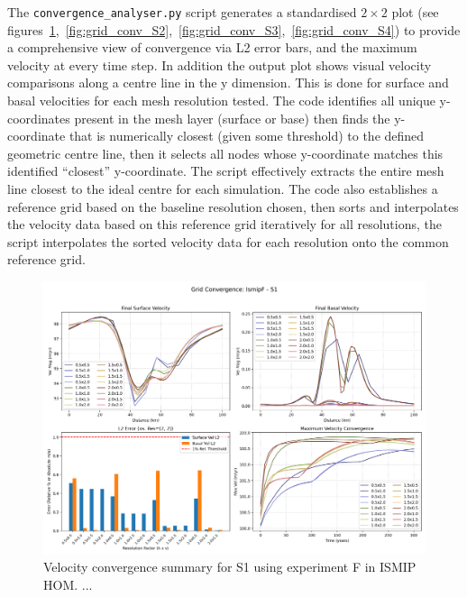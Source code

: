 The \texttt{convergence\_analyser.py} script generates a standardised $2\times2$ plot (see figures~\ref{fig:grid_conv_S1},~\ref{fig:grid_conv_S2},~\ref{fig:grid_conv_S3},~\ref{fig:grid_conv_S4}) to provide a comprehensive view of convergence via L2 error bars, and the maximum velocity at every time step. In addition the output plot shows visual velocity comparisons along a centre line in the y dimension. This is done for surface and basal velocities for each mesh resolution tested. The code identifies all unique y-coordinates present in the mesh layer (surface or base) then finds the y-coordinate that is numerically closest (given some threshold) to the defined geometric centre line, then it selects all nodes whose y-coordinate matches this identified ``closest'' y-coordinate. The script effectively extracts the entire mesh line closest to the ideal centre for each simulation. The code also establishes a reference grid based on the baseline resolution chosen, then sorts and interpolates the velocity data based on this reference grid iteratively for all resolutions, the script interpolates the sorted velocity data for each resolution onto the common reference grid. 

\begin{figure}[H]
    \includegraphics[scale=0.49]{IsmipF_S1_convergence_summary.png}
    \caption{Velocity convergence summary for S1 using experiment F in ISMIP HOM. ...}
    \label{fig:grid_conv_S1}
\end{figure}

